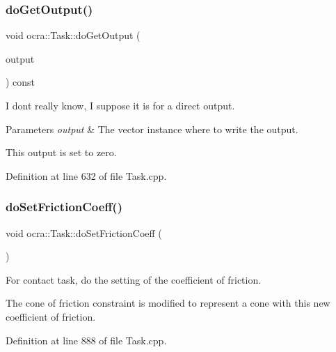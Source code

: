 \hypertarget{classocra_1_1Task_a96981db9ec0975c321ab46d182d3f6d8}{}\label{classocra_1_1Task_a96981db9ec0975c321ab46d182d3f6d8} 
\subsubsection{\texorpdfstring{do\+Get\+Output()}{doGetOutput()}}
{\footnotesize\ttfamily void ocra\+::\+Task\+::do\+Get\+Output (\begin{DoxyParamCaption}\item[{Eigen\+::\+Vector\+Xd \&}]{output }\end{DoxyParamCaption}) const\hspace{0.3cm}{\ttfamily [protected]}}

I don\textquotesingle{}t really know, I suppose it is for a direct output.


\begin{DoxyParams}{Parameters}
{\em output} & The vector instance where to write the output.\\
\hline
\end{DoxyParams}
This output is set to zero. 

Definition at line 632 of file Task.\+cpp.

\hypertarget{classocra_1_1Task_a575fdd8324142d60096bcb4e41b70d6a}{}\label{classocra_1_1Task_a575fdd8324142d60096bcb4e41b70d6a} 
\subsubsection{\texorpdfstring{do\+Set\+Friction\+Coeff()}{doSetFrictionCoeff()}}
{\footnotesize\ttfamily void ocra\+::\+Task\+::do\+Set\+Friction\+Coeff (\begin{DoxyParamCaption}{ }\end{DoxyParamCaption})\hspace{0.3cm}{\ttfamily [protected]}}

For contact task, do the setting of the coefficient of friction.

The cone of friction constraint is modified to represent a cone with this new coefficient of friction. 

Definition at line 888 of file Task.\+cpp.


